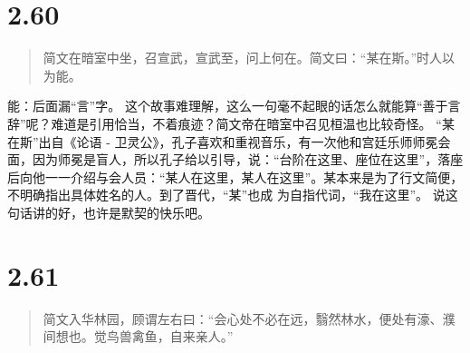 \documentclass[]{book}
\begin{document}
\section{2.60}\label{section-106}

\begin{quote}
简文在暗室中坐，召宣武，宣武至，问上何在。简文曰：``某在斯。''时人以为能。
\end{quote}

能：后面漏``言''字。
这个故事难理解，这么一句毫不起眼的话怎么就能算``善于言辞''呢？难道是引用恰当，不着痕迹？简文帝在暗室中召见桓温也比较奇怪。
``某在斯''出自《论语 -
卫灵公》，孔子喜欢和重视音乐，有一次他和宫廷乐师师冕会面，因为师冕是盲人，所以孔子给以引导，说：``台阶在这里、座位在这里''，落座后向他一一介绍与会人员：``某人在这里，某人在这里''。某本来是为了行文简便，不明确指出具体姓名的人。到了晋代，``某''也成
为自指代词，``我在这里''。 说这句话讲的好，也许是默契的快乐吧。

\section{2.61}\label{section-107}

\begin{quote}
简文入华林园，顾谓左右曰：``会心处不必在远，翳然林水，便处有濠、濮间想也。觉鸟兽禽鱼，自来亲人。''
\end{quote}
\end{document}
